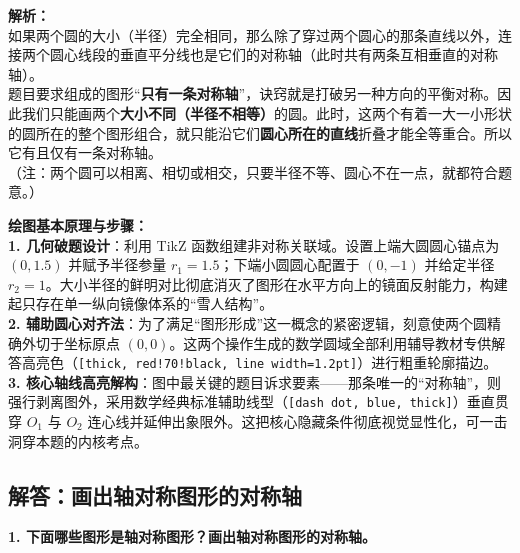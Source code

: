\vspace{0.8cm}

{\small\color{gray}
\textbf{解析：}\\
如果两个圆的大小（半径）完全相同，那么除了穿过两个圆心的那条直线以外，连接两个圆心线段的垂直平分线也是它们的对称轴（此时共有两条互相垂直的对称轴）。\\
题目要求组成的图形“\textbf{只有一条对称轴}”，诀窍就是打破另一种方向的平衡对称。因此我们只能画两个\textbf{大小不同（半径不相等）}的圆。此时，这两个有着一大一小形状的圆所在的整个图形组合，就只能沿它们\textbf{圆心所在的直线}折叠才能全等重合。所以它有且仅有一条对称轴。\\
（注：两个圆可以相离、相切或相交，只要半径不等、圆心不在一点，就都符合题意。）
}

\vspace{0.6cm}

{\small\color{blue!70!black}
\textbf{绘图基本原理与步骤：}\\
\textbf{1. 几何破题设计}：利用 TikZ 函数组建非对称关联域。设置上端大圆圆心锚点为 $(0, 1.5)$ 并赋予半径参量 $r_1=1.5$；下端小圆圆心配置于 $(0, -1)$ 并给定半径 $r_2=1$。大小半径的鲜明对比彻底消灭了图形在水平方向上的镜面反射能力，构建起只存在单一纵向镜像体系的“雪人结构”。\\
\textbf{2. 辅助圆心对齐法}：为了满足“图形形成”这一概念的紧密逻辑，刻意使两个圆精确外切于坐标原点 $(0,0)$。这两个操作生成的数学圆域全部利用辅导教材专供解答高亮色（\texttt{[thick, red!70!black, line width=1.2pt]}）进行粗重轮廓描边。\\
\textbf{3. 核心轴线高亮解构}：图中最关键的题目诉求要素——那条唯一的“对称轴”，则强行剥离图外，采用数学经典标准辅助线型（\texttt{[dash dot, blue, thick]}）垂直贯穿 $O_1$ 与 $O_2$ 连心线并延伸出象限外。这把核心隐藏条件彻底视觉显性化，可一击洞穿本题的内核考点。
}

\vspace{0.8cm}
\vspace{0.8cm}

\newpage

\subsection{解答：画出轴对称图形的对称轴}

\vspace{0.4cm}

\noindent\textbf{1. 下面哪些图形是轴对称图形？画出轴对称图形的对称轴。}

\vspace{1.2cm}

